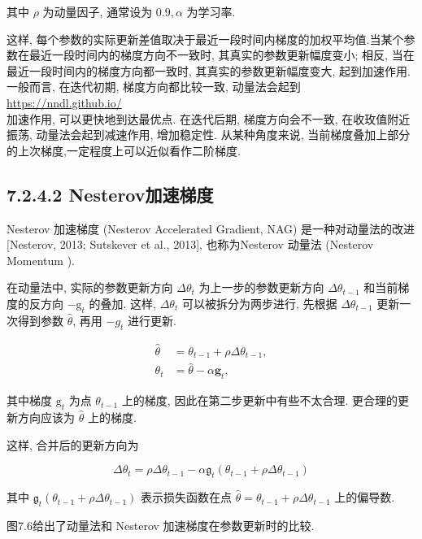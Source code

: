 \documentclass[10pt]{article}
\begin{document}
其中 $\rho$ 为动量因子, 通常设为 $0.9, \alpha$ 为学习率.

这样, 每个参数的实际更新差值取决于最近一段时间内梯度的加权平均值.当某个参数在最近一段时间内的梯度方向不一致时, 其真实的参数更新幅度变小; 相反, 当在最近一段时间内的梯度方向都一致时, 其真实的参数更新幅度变大, 起到加速作用. 一般而言, 在迭代初期, 梯度方向都比较一致, 动量法会起到 \href{https://nndl.github.io/}{https://nndl.github.io/}\\
加速作用, 可以更快地到达最优点. 在迭代后期, 梯度方向会不一致, 在收玫值附近振荡, 动量法会起到减速作用, 增加稳定性. 从某种角度来说, 当前梯度叠加上部分的上次梯度,一定程度上可以近似看作二阶梯度.

\subsection*{7.2.4.2 Nesterov加速梯度}
Nesterov 加速梯度 (Nesterov Accelerated Gradient, NAG) 是一种对动量法的改进 [Nesterov, 2013; Sutskever et al., 2013], 也称为Nesterov 动量法 (Nesterov Momentum ).

在动量法中, 实际的参数更新方向 $\Delta \theta_{t}$ 为上一步的参数更新方向 $\Delta \theta_{t-1}$ 和当前梯度的反方向 $-\mathrm{g}_{t}$ 的叠加. 这样, $\Delta \theta_{t}$ 可以被拆分为两步进行, 先根据 $\Delta \theta_{t-1}$ 更新一次得到参数 $\hat{\theta}$, 再用 $-g_{t}$ 进行更新.


\begin{align*}
\hat{\theta} & =\theta_{t-1}+\rho \Delta \theta_{t-1},  \tag{7.22}\\
\theta_{t} & =\hat{\theta}-\alpha \mathbf{g}_{t}, \tag{7.23}
\end{align*}


其中梯度 $\mathrm{g}_{t}$ 为点 $\theta_{t-1}$ 上的梯度, 因此在第二步更新中有些不太合理. 更合理的更新方向应该为 $\hat{\theta}$ 上的梯度.

这样, 合并后的更新方向为


\begin{equation*}
\Delta \theta_{t}=\rho \Delta \theta_{t-1}-\alpha \mathfrak{g}_{t}\left(\theta_{t-1}+\rho \Delta \theta_{t-1}\right) \tag{7.24}
\end{equation*}


其中 $\mathfrak{g}_{t}\left(\theta_{t-1}+\rho \Delta \theta_{t-1}\right)$ 表示损失函数在点 $\hat{\theta}=\theta_{t-1}+\rho \Delta \theta_{t-1}$ 上的偏导数.

图7.6给出了动量法和 Nesterov 加速梯度在参数更新时的比较.
\end{document}
